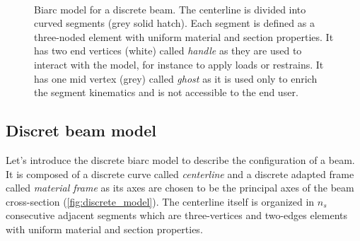 \begin{figure}[p]
\begin{fullpage}
	\captionsetup[subfloat]{captionskip=20pt}
     	\centering
     	 \\
	\vspace{30pt}
	\vspace{20pt}
	\caption{Biarc model for a discrete beam. The centerline is divided into curved segments (grey solid hatch). Each segment is defined as a three-noded element with uniform material and section properties. It has two end vertices (white) called \emph{handle} as they are used to interact with the model, for instance to apply loads or restrains. It has one mid vertex (grey) called \emph{ghost} as it is used only to enrich the segment kinematics and is not accessible to the end user.}
\end{fullpage}
\end{figure}



\clearpage
\subsection{Discret beam model}



Let's introduce the discrete biarc model to describe the configuration of a beam. It is composed of a discrete curve called \emph{centerline} and a discrete adapted frame called \emph{material frame} as its axes are chosen to be the principal axes of the beam cross-section (\cref{fig:discrete_model}). The centerline itself is organized in $n_s$ consecutive adjacent segments which are three-vertices and two-edges elements with uniform material and section properties.

